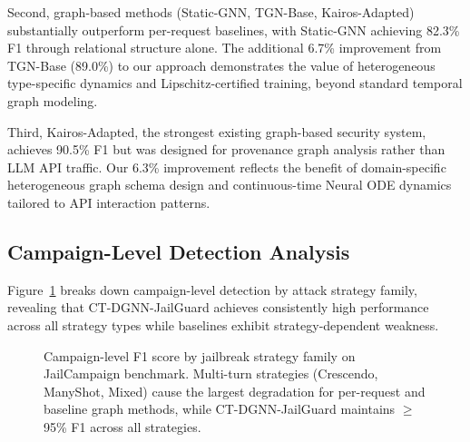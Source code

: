 \documentclass[journal]{IEEEtran}
\theoremstyle{plain}
\theoremstyle{definition}
\theoremstyle{remark}
\begin{document}
Second, graph-based methods (Static-GNN, TGN-Base, Kairos-Adapted) substantially outperform per-request baselines, with Static-GNN achieving 82.3\% F1 through relational structure alone. The additional 6.7\% improvement from TGN-Base (89.0\%) to our approach demonstrates the value of heterogeneous type-specific dynamics and Lipschitz-certified training, beyond standard temporal graph modeling.

Third, Kairos-Adapted, the strongest existing graph-based security system, achieves 90.5\% F1 but was designed for provenance graph analysis rather than LLM API traffic. Our 6.3\% improvement reflects the benefit of domain-specific heterogeneous graph schema design and continuous-time Neural ODE dynamics tailored to API interaction patterns.

\subsection{Campaign-Level Detection Analysis}

Figure~\ref{fig:campaign_performance} breaks down campaign-level detection by attack strategy family, revealing that CT-DGNN-JailGuard achieves consistently high performance across all strategy types while baselines exhibit strategy-dependent weakness.

\begin{figure}[t]
\centering
{}
\caption{Campaign-level F1 score by jailbreak strategy family on JailCampaign benchmark. Multi-turn strategies (Crescendo, ManyShot, Mixed) cause the largest degradation for per-request and baseline graph methods, while CT-DGNN-JailGuard maintains $\geq$95\% F1 across all strategies.}
\label{fig:campaign_performance}
\end{figure}
\end{document}
